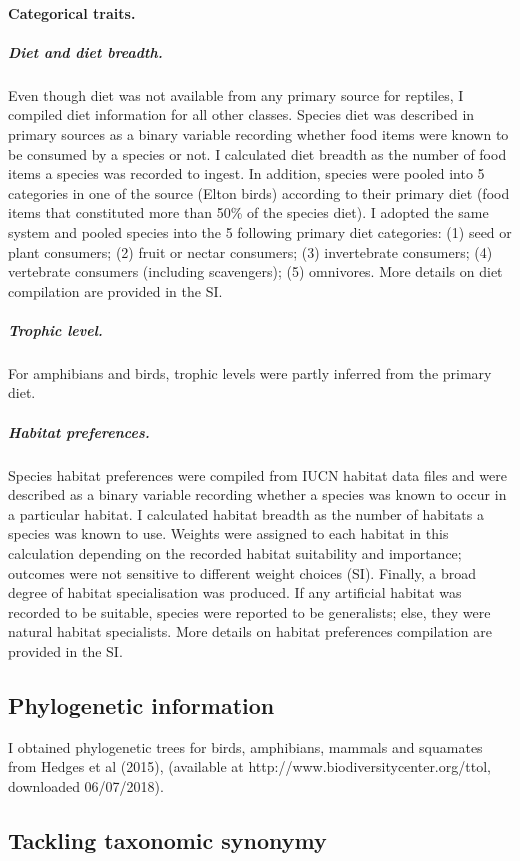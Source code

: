 \paragraph{Categorical traits.}
\subparagraph{Diet and diet breadth.} Even though diet was not available from any primary source for reptiles, I compiled diet information for all other classes. Species diet was described in primary sources as a binary variable recording whether food items were known to be consumed by a species or not. I calculated diet breadth as the number of food items a species was recorded to ingest. In addition,  species were pooled into 5 categories in one of the source (Elton birds) according to their primary diet (food items that constituted more than 50\% of the species diet). I adopted the same system and  pooled species into the 5 following primary diet categories: (1) seed or plant consumers; (2) fruit or nectar consumers; (3) invertebrate consumers; (4) vertebrate consumers (including scavengers); (5) omnivores. More details on diet compilation are provided in the SI. 
\subparagraph{Trophic level.} For amphibians and birds, trophic levels were partly inferred from the primary diet. 
\subparagraph{Habitat preferences.}
Species habitat preferences were compiled from IUCN habitat data files and were described as a binary variable recording whether a species was known to occur in a particular habitat. I calculated habitat breadth as the number of habitats a species was known to use. Weights were assigned to each habitat in this calculation depending on the recorded habitat suitability and importance; outcomes were not sensitive to different weight choices (SI). Finally, a broad degree of habitat specialisation was produced. If any artificial habitat was recorded to be suitable, species were reported to be generalists; else, they were natural habitat specialists. More details on habitat preferences compilation are provided in the SI. 

\subsection{Phylogenetic information}
I obtained phylogenetic trees for birds, amphibians, mammals and squamates from Hedges et al (2015), (available at http://www.biodiversitycenter.org/ttol, downloaded 06/07/2018).

\subsection{Tackling taxonomic synonymy}

